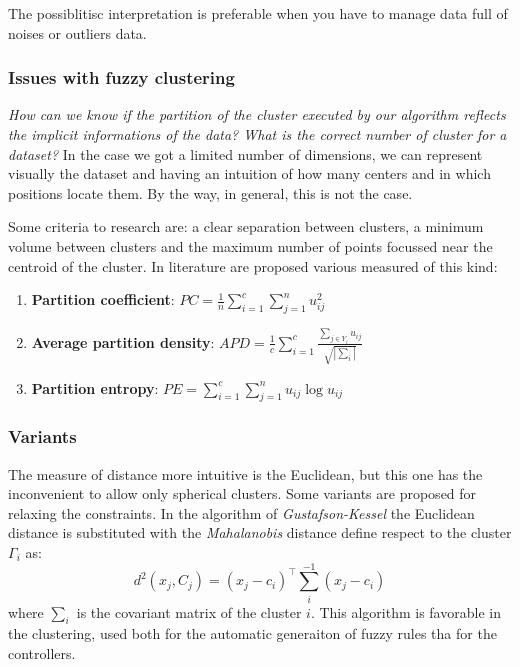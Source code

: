 \documentclass{article}
\begin{document}
The possiblitisc interpretation is preferable when you have to manage data full of
noises or outliers data.

\subsubsection{Issues with fuzzy clustering}
\textit{How can we know if the partition of the cluster executed by
    our algorithm reflects the implicit informations of the data? What is the
    correct number of cluster for a dataset?} In the case we got a limited number of
dimensions, we can represent visually the dataset and having an intuition of
how many centers and in which positions locate them. By the way, in general,
this is not the case.

Some criteria to research are: a clear separation between clusters, a minimum
volume between clusters and the maximum number of points focussed near the centroid
of the cluster. In literature are proposed various measured of this kind:
\begin{enumerate}
    \item \textbf{Partition coefficient}: $PC=\frac{1}{n}\sum_{i=1}^c\sum_{j=1}^n u^2_{ij}$
    \item \textbf{Average partition density}: $APD=\frac{1}{c}\sum_{i=1}^c \frac{\sum_{j\in Y_i} u_{ij}}{\sqrt{|\sum_i|}}$
    \item \textbf{Partition entropy}: $PE=\sum_{i=1}^c\sum_{j=1}^n u_{ij}\log u_{ij}$
\end{enumerate}

\subsubsection{Variants}
The measure of distance more intuitive is the Euclidean, but this one has the inconvenient
to allow only spherical clusters. Some variants are proposed for relaxing the constraints.
In the algorithm of \textit{Gustafson-Kessel} the Euclidean distance is substituted with the
\textit{Mahalanobis} distance define respect to the cluster $\Gamma_i$ as:
$$d^2(x_j,C_j)=(x_j-c_i)^\top\sum_i^{-1}(x_j-c_i)$$
where $\sum_i$ is the covariant matrix of the cluster $i$. This algorithm is favorable
in the clustering, used both for the automatic generaiton of fuzzy rules tha for the controllers.
\end{document}
